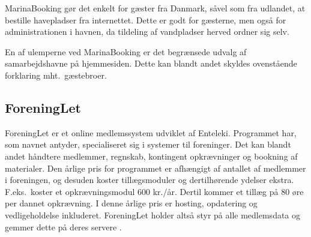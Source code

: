 MarinaBooking gør det enkelt for gæster fra Danmark, såvel som fra udlandet, at bestille havepladser fra internettet. Dette er godt for gæsterne, men også for administrationen i havnen, da tildeling af vandpladser herved ordner sig selv.

En af ulemperne ved MarinaBooking er det begrænsede udvalg af samarbejdshavne på hjemmesiden. Dette kan blandt andet skyldes ovenstående forklaring mht.\ gæstebroer.








\subsection{ForeningLet} %
\label{sub:ForeningLet}

ForeningLet er et online medlemssystem udviklet af Enteleki. Programmet har, som navnet antyder, specialiseret sig i systemer til foreninger. Det kan blandt andet håndtere medlemmer, regnskab, kontingent opkrævninger og bookning af materialer. Den årlige pris for programmet er afhængigt af antallet af medlemmer i foreningen, og desuden koster tillægsmoduler og dertilhørende ydelser ekstra. F.eks.\ koster et opkrævningsmodul 600 kr./år. Dertil kommer et tillæg på 80 øre per dannet opkrævning. I denne årlige pris er hosting, opdatering og vedligeholdelse inkluderet. ForeningLet holder altså styr på alle medlemsdata og gemmer dette på deres servere \cite{foreninglet}.

